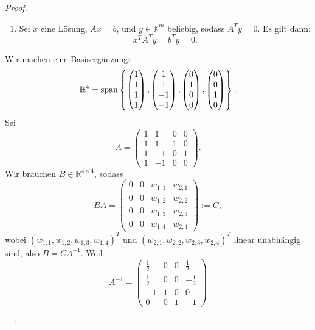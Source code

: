 \begin{proof}
\begin{parts}
\item 
	\begin{enumerate}
		\item Sei $x$ eine Lösung, $Ax=b$, und $y\in \mathbb{K}^m$ beliebig, sodass $A^Ty=0$. Es gilt dann:
			 \[
			x^TA^Ty=b^Ty=0
			.\] 
	\end{enumerate}
\item Wir machen eine Basisergänzung:
	\[
		\mathbb{R}^4=\text{span}\left\{ \begin{pmatrix} 1 \\ 1 \\ 1 \\ 1 \end{pmatrix},\begin{pmatrix} 1 \\ 1 \\ -1 \\ -1 \end{pmatrix}, \begin{pmatrix} 0 \\ 1 \\ 0 \\ 0 \end{pmatrix}, \begin{pmatrix} 0 \\ 0 \\ 1 \\ 0 \end{pmatrix}  \right\} 
	.\] 
Sei 
\[
	A=\begin{pmatrix} 1 & 1 & 0 & 0\\1 & 1 & 1 & 0 \\ 1 & -1 & 0 & 1 \\ 1 & -1 & 0 & 0 \end{pmatrix} 
.\] 
Wir brauchen $B\in\mathbb{R}^{4\times 4}$, sodass
\[
	BA=\begin{pmatrix} 0 & 0 & w_{1,1} & w_{2,1}\\ 0 & 0 & w_{1,2} & w_{2,2} \\ 0 & 0 & w_{1,3} & w_{2,3} \\ 0 & 0 & w_{1,4} & w_{2,4} \end{pmatrix}:=C 
,\] 
wobei $(w_{1,1}, w_{1,2}, w_{1,3}, w_{1,4})^T$ und $(w_{2,1},w_{2,2},w_{2,3},w_{2,4})^T$ linear unabhängig sind, also $B=CA^{-1}$. Weil
 \[
	 A^{-1}=\begin{pmatrix} \frac{1}{2}& 0 & 0 & \frac{1}{2}\\ \frac{1}{2}& 0 & 0 & -\frac{1}{2}\\ -1 & 1 & 0 & 0 \\ 0 & 0 & 1 & -1 \end{pmatrix} 
\]
\end{parts}
\end{proof}
